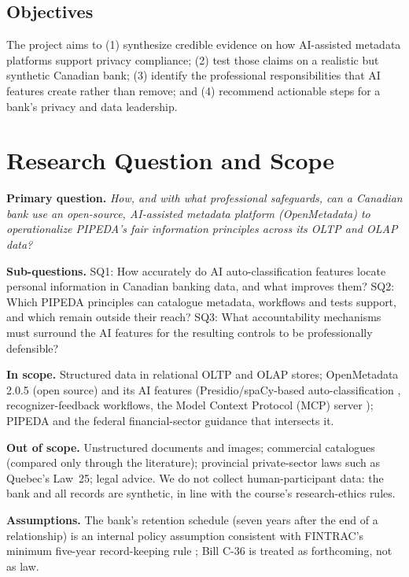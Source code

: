 \documentclass[journal,onecolumn,11pt]{IEEEtran}
\begin{document}
\subsection{Objectives}
The project aims to (1) synthesize credible evidence on how AI-assisted metadata platforms support privacy compliance; (2) test those claims on a realistic but synthetic Canadian bank; (3) identify the professional responsibilities that AI features create rather than remove; and (4) recommend actionable steps for a bank's privacy and data leadership.

\section{Research Question and Scope}
\textbf{Primary question.} \emph{How, and with what professional safeguards, can a Canadian bank use an open-source, AI-assisted metadata platform (OpenMetadata) to operationalize PIPEDA's fair information principles across its OLTP and OLAP data?}

\textbf{Sub-questions.} SQ1: How accurately do AI auto-classification features locate personal information in Canadian banking data, and what improves them? SQ2: Which PIPEDA principles can catalogue metadata, workflows and tests support, and which remain outside their reach? SQ3: What accountability mechanisms must surround the AI features for the resulting controls to be professionally defensible?

\textbf{In scope.} Structured data in relational OLTP and OLAP stores; OpenMetadata 2.0.5 (open source) and its AI features (Presidio/spaCy-based auto-classification \cite{presidio}, recognizer-feedback workflows, the Model Context Protocol (MCP) server \cite{om_mcp}); PIPEDA and the federal financial-sector guidance that intersects it.

\textbf{Out of scope.} Unstructured documents and images; commercial catalogues (compared only through the literature); provincial private-sector laws such as Quebec's Law~25; legal advice. We do not collect human-participant data: the bank and all records are synthetic, in line with the course's research-ethics rules.

\textbf{Assumptions.} The bank's retention schedule (seven years after the end of a relationship) is an internal policy assumption consistent with FINTRAC's minimum five-year record-keeping rule \cite{fintrac_records}; Bill C-36 is treated as forthcoming, not as law.
\end{document}
